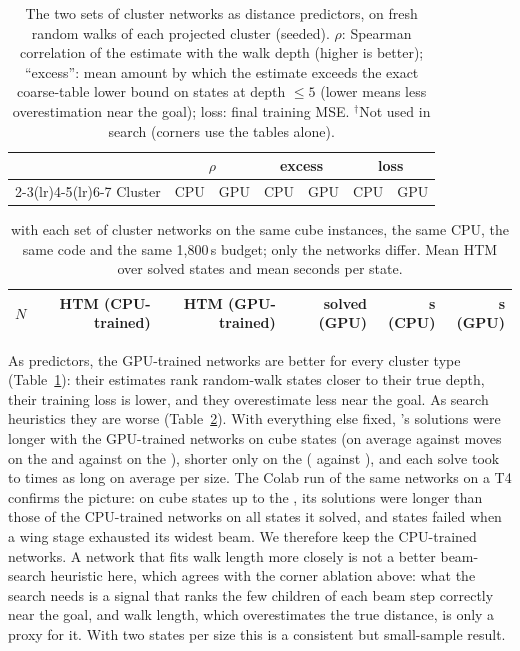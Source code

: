 \begin{table}[t]
\caption{The two sets of \FiveB cluster networks as distance predictors, on fresh random walks of each
projected cluster (seeded). $\rho$: Spearman correlation of the estimate with the walk depth (higher is
better); ``excess'': mean amount by which the estimate exceeds the exact coarse-table lower bound on states
at depth $\le5$ (lower means less overestimation near the goal); loss: final training MSE.
$^\dagger$Not used in search (corners use the tables alone).}
\label{tab:5bmodels}
\small\setlength{\tabcolsep}{3.5pt}
\begin{tabular}{@{}lrrrrrr@{}}
\toprule
 & \multicolumn{2}{c}{$\rho$} & \multicolumn{2}{c}{excess} & \multicolumn{2}{c}{loss} \\
\cmidrule(lr){2-3}\cmidrule(lr){4-5}\cmidrule(lr){6-7}
Cluster & CPU & GPU & CPU & GPU & CPU & GPU \\
\midrule

\end{tabular}
\end{table}

\begin{table}[t]
\caption{\FiveB with each set of cluster networks on the same cube instances, the same CPU, the same code
and the same 1,800\,s budget; only the networks differ. Mean HTM over solved states and mean seconds per
state.}
\label{tab:5bcpugpu}
\small\setlength{\tabcolsep}{4pt}
\begin{tabular}{@{}rrrrrr@{}}
\toprule
$N$ & HTM (CPU-trained) & HTM (GPU-trained) & solved (GPU) & s (CPU) & s (GPU) \\
\midrule

\end{tabular}
\end{table}

As predictors, the GPU-trained networks are better for every cluster type (Table~\ref{tab:5bmodels}): their
estimates rank random-walk states closer to their true depth, their training loss is lower, and they
overestimate less near the goal. As search heuristics they are worse (Table~\ref{tab:5bcpugpu}). With
everything else fixed, \FiveB's solutions were longer with the GPU-trained networks on \AbGpuLonger{} cube
states (on average \AbGpuFour{} against \AbCpuFour{} moves on the  and \AbGpuSix{} against
\AbCpuSix{} on the ), shorter only on the  (\AbGpuFive{} against \AbCpuFive{}), and each solve
took \AbSlowMin{} to \AbSlowMax{} times as long on average per size. The Colab run of the same networks on a T4 confirms the picture: on \ColabTried{} cube states up to
the \Cu{\ColabMaxN}, its solutions were longer than those of the CPU-trained networks on all
\ColabLonger{} states it solved, and \ColabFailed{} states failed when a wing stage exhausted its widest beam.
We therefore keep the CPU-trained networks. A network that fits walk length more closely is not a better
beam-search heuristic here, which agrees with the corner ablation above: what the search needs is a signal
that ranks the few children of each beam step correctly near the goal, and walk length, which overestimates
the true distance, is only a proxy for it. With two states per size this is a consistent but small-sample
result.

